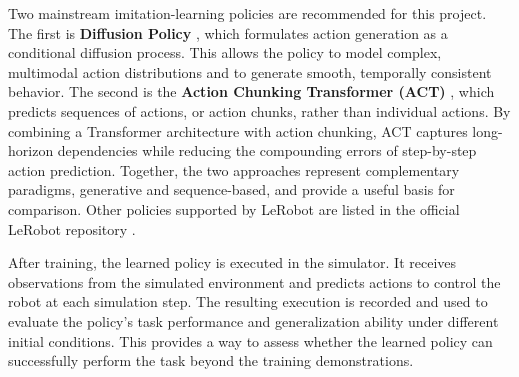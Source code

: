 \documentclass[11pt]{article}
\begin{document}
% 

Two mainstream imitation-learning\cite{wiki_imitation_learning} policies are recommended for this project. The first is \textbf{Diffusion Policy} \cite{chi2023diffusionpolicy}, which formulates action generation as a conditional diffusion process. This allows the policy to model complex, multimodal action distributions and to generate smooth, temporally consistent behavior. The second is the \textbf{Action Chunking Transformer (ACT)} \cite{zhao2023act}, which predicts sequences of actions, or action chunks, rather than individual actions. By combining a Transformer architecture with action chunking, ACT captures long-horizon dependencies while reducing the compounding errors of step-by-step action prediction. Together, the two approaches represent complementary paradigms, generative and sequence-based, and provide a useful basis for comparison. Other policies supported by LeRobot are listed in the official LeRobot repository \cite{cadene2024lerobot}.

After training, the learned policy is executed in the simulator. It receives observations from the simulated environment and predicts actions to control the robot at each simulation step. The resulting execution is recorded and used to evaluate the policy's task performance and generalization ability under different initial conditions. This provides a way to assess whether the learned policy can successfully perform the task beyond the training demonstrations.
\end{document}
